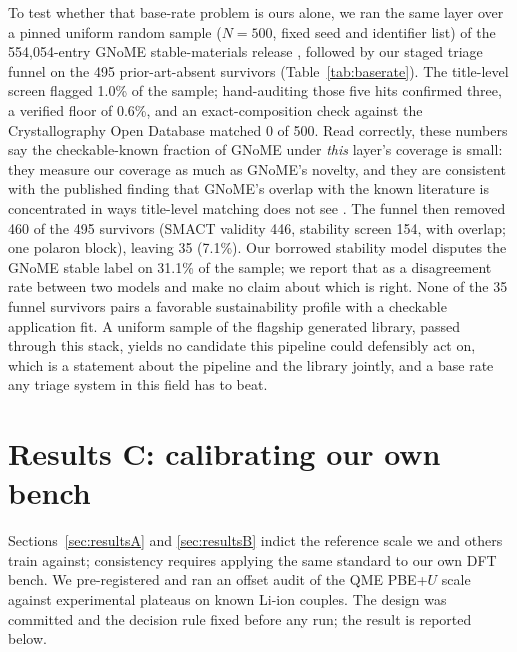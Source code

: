 \documentclass[reprint,aps,prb,amsmath,amssymb,nofootinbib,longbibliography]{revtex4-2}
\begin{document}
To test whether that base-rate problem is ours alone, we ran the same layer
over a pinned uniform random sample ($N=500$, fixed seed and identifier
list) of the 554{,}054-entry GNoME stable-materials release
\cite{merchant2023}, followed by our staged triage funnel on the 495
prior-art-absent survivors (Table~\ref{tab:baserate}). The title-level
screen flagged 1.0\% of the sample; hand-auditing those five hits confirmed
three, a verified floor of 0.6\%, and an exact-composition check against the
Crystallography Open Database matched 0 of 500. Read correctly, these
numbers say the checkable-known fraction of GNoME under \emph{this} layer's
coverage is small: they measure our coverage as much as GNoME's novelty,
and they are consistent with the published finding that GNoME's overlap with
the known literature is concentrated in ways title-level matching does not
see \cite{cheetham2024,leeman2024}. The funnel then removed 460 of the 495
survivors (SMACT validity 446, stability screen 154, with overlap; one
polaron block), leaving 35 (7.1\%). Our borrowed stability model disputes
the GNoME stable label on 31.1\% of the sample; we report that as a
disagreement rate between two models and make no claim about which is right.
None of the 35 funnel survivors pairs a favorable sustainability profile
with a checkable application fit. A uniform sample of the flagship generated
library, passed through this stack, yields no candidate this pipeline could
defensibly act on, which is a statement about the pipeline and the
library jointly, and a base rate any triage system in this field has to
beat.

\section{Results C: calibrating our own bench}
\label{sec:resultsC}

Sections~\ref{sec:resultsA} and \ref{sec:resultsB} indict the reference
scale we and others train against; consistency requires applying the same
standard to our own DFT bench. We pre-registered and ran an offset audit of
the QME PBE+$U$ scale against experimental plateaus on known Li-ion couples.
The design was committed and the decision rule fixed before any run; the
result is reported below.

\begin{table}[tb]
\caption{\label{tab:d1}The pre-registered offset audit. Each couple is
computed as a paired vc-relax on the local bench under the anchor-scale
settings (Sec.~\ref{sec:methods}); $\delta = V_{\mathrm{QME}} -
V_{\mathrm{exp}}$. The  pair is a pre-registered stretch
compound: if either half converges outside its registered spin manifold,
the verdict is issued on the $n=3$ core and the exclusion is reported. The
verdict gate, fixed before any run: $\mathrm{sd}(\delta) < \SI{0.15}{\volt}$
means the scale is calibratable and voltages publish with the calibrated
offset and error bars; $\mathrm{sd}(\delta) \ge \SI{0.3}{\volt}$ retires
absolute-voltage claims pipeline-wide in favor of ranking-only language; the
zone between is an operator decision documented at sync time.}

\end{table}
\end{document}
